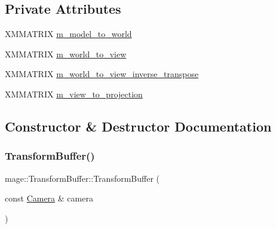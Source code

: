 \subsection*{Private Attributes}
\begin{DoxyCompactItemize}
\item 
X\+M\+M\+A\+T\+R\+IX \hyperlink{structmage_1_1_transform_buffer_ac5f95a7f0e9ac61140c3520675da8e52}{m\+\_\+model\+\_\+to\+\_\+world}
\item 
X\+M\+M\+A\+T\+R\+IX \hyperlink{structmage_1_1_transform_buffer_af014f4da6aa86484c99c6b429af7da75}{m\+\_\+world\+\_\+to\+\_\+view}
\item 
X\+M\+M\+A\+T\+R\+IX \hyperlink{structmage_1_1_transform_buffer_a334cb416c43803c805bc7b57fe3a908e}{m\+\_\+world\+\_\+to\+\_\+view\+\_\+inverse\+\_\+transpose}
\item 
X\+M\+M\+A\+T\+R\+IX \hyperlink{structmage_1_1_transform_buffer_a4f077fa865fe8edf41619f5941ee605c}{m\+\_\+view\+\_\+to\+\_\+projection}
\end{DoxyCompactItemize}


\subsection{Constructor \& Destructor Documentation}
\hypertarget{structmage_1_1_transform_buffer_a9a627fb63533073b2c699136e04dae14}{}\label{structmage_1_1_transform_buffer_a9a627fb63533073b2c699136e04dae14} 
\subsubsection{\texorpdfstring{Transform\+Buffer()}{TransformBuffer()}\hspace{0.1cm}{\footnotesize\ttfamily [1/3]}}
{\footnotesize\ttfamily mage\+::\+Transform\+Buffer\+::\+Transform\+Buffer (\begin{DoxyParamCaption}\item[{const \hyperlink{classmage_1_1_camera}{Camera} \&}]{camera }\end{DoxyParamCaption})}

\hypertarget{structmage_1_1_transform_buffer_a1ede694450450cc6b13a5caed373abad}{}\label{structmage_1_1_transform_buffer_a1ede694450450cc6b13a5caed373abad} 
